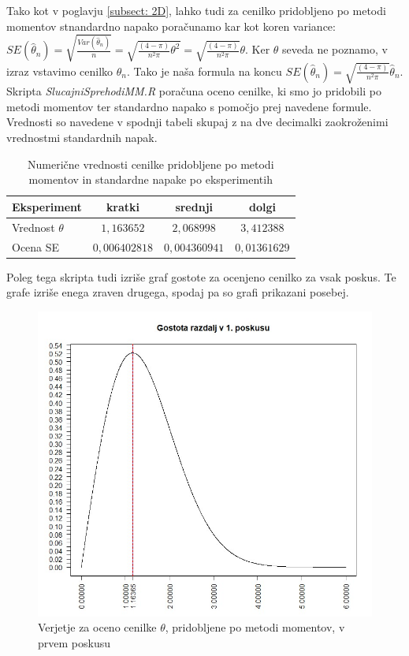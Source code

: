 \documentclass[a4paper, 10pt]{article}
\begin{document}
	Tako kot v poglavju \ref{subsect: 2D}, lahko tudi za cenilko pridobljeno po metodi momentov stnandardno napako poračunamo kar kot koren variance: $SE(\widehat{\theta}_n) = \sqrt{\frac{Var(\widehat{\theta}_n)}{n}} = \sqrt{\frac{(4-\pi)}{n^2\pi}\theta^2} = \sqrt{\frac{(4-\pi)}{n^2\pi}}\theta$. Ker $\theta$ seveda ne poznamo, v izraz vstavimo cenilko $\widehat{\theta}_n$. Tako je naša formula na koncu $SE(\widehat{\theta}_n) = \sqrt{\frac{(4-\pi)}{n^2\pi}}\widehat{\theta}_n$. Skripta \textit{SlucajniSprehodiMM.R} poračuna oceno cenilke, ki smo jo pridobili po metodi momentov ter standardno napako s pomočjo prej navedene formule. Vrednosti so navedene v spodnji tabeli skupaj z na dve decimalki zaokroženimi vrednostmi standardnih napak.
	
	\begin{table}[h!]
		\label{tab: mmse}
		\centering
		\begin{tabular}{|l|c|c|c|}
			\hline
			Eksperiment & kratki & srednji & dolgi \\ \hline
			Vrednost $\theta$ & $1{,}163652$ & $2{,}068998$ & $3{,}412388$ \\ \hline
			Ocena SE & $0{,}006402818$ & $0{,}004360941$ & $0{,}01361629$ \\ \hline
		\end{tabular}
		\caption{Numerične vrednosti cenilke pridobljene po metodi momentov in standardne napake po eksperimentih}
	\end{table}

	Poleg tega skripta tudi izriše graf gostote za ocenjeno cenilko za vsak poskus. Te grafe izriše enega zraven drugega, spodaj pa so grafi prikazani posebej.
	
	\begin{figure}[h!]
		\label{fig: 2Eplot1}
		\centering
		\includegraphics[scale = 0.4]{VerjetjeMM1}
		\caption{Verjetje za oceno cenilke $\theta$, pridobljene po metodi momentov, v prvem poskusu}
	\end{figure}
	
\end{document}
